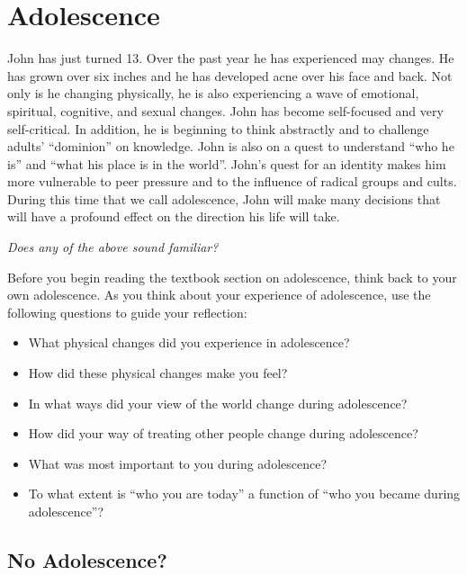 \documentclass[
]{book}
\providecommand{\tightlist}{%
  \setlength{\itemsep}{0pt}\setlength{\parskip}{0pt}}
\begin{document}
\hypertarget{adolescence}{%
\section{Adolescence}\label{adolescence}}

John has just turned 13. Over the past year he has experienced may changes. He has grown over six inches and he has developed acne over his face and back. Not only is he changing physically, he is also experiencing a wave of emotional, spiritual, cognitive, and sexual changes. John has become self-focused and very self-critical. In addition, he is beginning to think abstractly and to challenge adults' ``dominion'' on knowledge. John is also on a quest to understand ``who he is'' and ``what his place is in the world''. John's quest for an identity makes him more vulnerable to peer pressure and to the influence of radical groups and cults. During this time that we call adolescence, John will make many decisions that will have a profound effect on the direction his life will take.

\emph{Does any of the above sound familiar?}

Before you begin reading the textbook section on adolescence, think back to your own adolescence. As you think about your experience of adolescence, use the following questions to guide your reflection:

\begin{itemize}
\tightlist
\item
  What physical changes did you experience in adolescence?
\item
  How did these physical changes make you feel?
\item
  In what ways did your view of the world change during adolescence?
\item
  How did your way of treating other people change during adolescence?
\item
  What was most important to you during adolescence?
\item
  To what extent is ``who you are today'' a function of ``who you became during adolescence''?
\end{itemize}

\hypertarget{no-adolescence}{%
\subsection*{No Adolescence?}\label{no-adolescence}}
\end{document}
